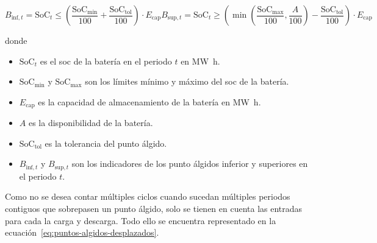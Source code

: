 \begin{samepage}

  \begin{subequations}
    \label{eq:puntos-algidos-inf-sup}

    \begin{equation}
      B_{\text{inf}, t} = \mathrm{SoC}_{t} \le \left( \frac{\mathrm{SoC}_{\text{min}}}{100} + \frac{\mathrm{SoC}_{\text{tol}}}{100} \right) \cdot E_{\text{cap}}
    \end{equation}

    \begin{equation}
      B_{\text{sup}, t} = \mathrm{SoC}_{t} \ge \left( \min\left(\frac{\mathrm{SoC}_{\text{max}}}{100}, \frac{A}{100}\right) - \frac{\mathrm{SoC}_{\text{tol}}}{100} \right) \cdot E_{\text{cap}}
    \end{equation}

  \end{subequations}

  donde

  \begin{itemize}

    \item \( \mathrm{SoC}_{t} \) es el \gls{soc} de la batería en el periodo \( t \) en \si{{\mega\watt\hour}}.

    \item \( \mathrm{SoC}_{\text{min}} \) y \( \mathrm{SoC}_{\text{max}} \) son los límites mínimo y máximo del \gls{soc} de la batería.

    \item \( E_{\text{cap}} \) es la capacidad de almacenamiento de la batería en \si{{\mega\watt\hour}}.

    \item \( A \) es la disponibilidad de la batería.

    \item \( \mathrm{SoC}_{\text{tol}} \) es la tolerancia del punto álgido.

    \item \( B_{\text{inf}, t} \) y \( B_{\text{sup}, t} \) son los indicadores de los punto álgidos inferior y superiores en el periodo \( t \).

  \end{itemize}

\end{samepage}

Como no se desea contar múltiples ciclos cuando sucedan múltiples periodos contiguos que sobrepasen un punto álgido, solo se tienen en cuenta las entradas para cada la carga y descarga. Todo ello se encuentra representado en la ecuación~\ref{eq:puntos-algidos-desplazados}.


